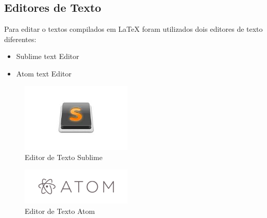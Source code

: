 \subsection{Editores de Texto}
\label{sub:Editores de Texto}
Para editar o textos compilados em LaTeX foram utilizados dois editores de texto diferentes:
\begin{itemize}
  \item Sublime text Editor
  \item Atom text Editor
\end{itemize}

\begin{figure}[h]
  \centering
  \includegraphics[width=200px, scale=0.5]{figuras/sublime}
  \caption{Editor de Texto Sublime}
  \label{table:sublime}
\end{figure}
\begin{figure}[h]
  \centering
  \includegraphics[width=200px, scale=0.5]{figuras/atom}
  \caption{Editor de Texto Atom}
  \label{table:atom}
\end{figure}

